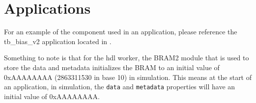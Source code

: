 \section*{Applications}
\begin{flushleft}

For an example of the {\comp} component used in an application, please reference the
tb\_bias\_v2 application located in . \newline

Something to note is that for the hdl worker, the BRAM2 module that is used to store the data and metadata initializes the BRAM to an initial value of 0xAAAAAAAA (2863311530 in base 10) in simulation. This means at the start of an application, in simulation, the \texttt{data} and \texttt{metadata} properties will have an initial value of 0xAAAAAAAA.

\end{flushleft}


